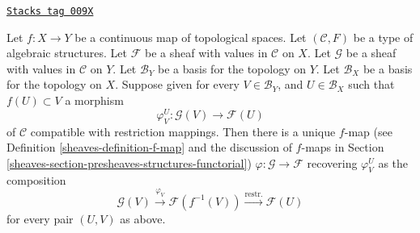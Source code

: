 \begin{lemma}
\label{sheaves-lemma-f-map-basis-above-and-below-structures}
\href{https://stacks.math.columbia.edu/tag/009X}{\texttt{Stacks tag 009X}}

Let $f : X \to Y$ be a continuous map of topological spaces.
Let $(\mathcal{C}, F)$ be a type of algebraic structures.
Let $\mathcal{F}$ be a sheaf with values in $\mathcal{C}$ on $X$.
Let $\mathcal{G}$ be a sheaf with values in $\mathcal{C}$ on $Y$.
Let $\mathcal{B}_Y$ be a basis for the topology on $Y$.
Let $\mathcal{B}_X$ be a basis for the topology on $X$.
Suppose given for every $V \in \mathcal{B}_Y$, and
$U \in \mathcal{B}_X$ such that $f(U) \subset V$ a morphism
$$
\varphi_V^U :
\mathcal{G}(V)
\longrightarrow
\mathcal{F}(U)
$$
of $\mathcal{C}$ compatible with restriction mappings.
Then there is a unique $f$-map (see
Definition \ref{sheaves-definition-f-map} and the discussion
of $f$-maps in Section \ref{sheaves-section-presheaves-structures-functorial})
$\varphi : \mathcal{G} \to \mathcal{F}$
recovering $\varphi_V^U$ as the composition
$$
\mathcal{G}(V) \xrightarrow{\varphi_V}
\mathcal{F}(f^{-1}(V)) \xrightarrow{\text{restr.}}
\mathcal{F}(U)
$$
for every pair $(U, V)$ as above.
\end{lemma}

